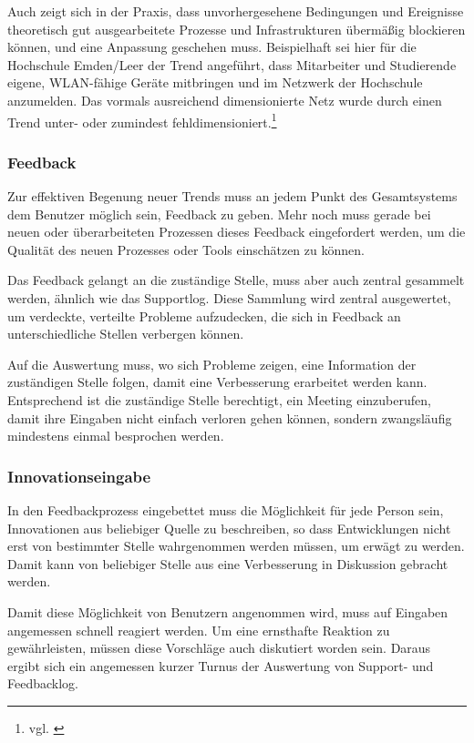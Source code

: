 Auch zeigt sich in der Praxis, dass unvorhergesehene Bedingungen und Ereignisse theoretisch gut ausgearbeitete Prozesse und Infrastrukturen übermäßig blockieren können, und eine Anpassung geschehen muss. Beispielhaft sei hier für die Hochschule Emden/Leer der Trend angeführt, dass Mitarbeiter und Studierende eigene, WLAN-fähige Geräte mitbringen und im Netzwerk der Hochschule anzumelden. Das vormals ausreichend dimensionierte Netz wurde durch einen Trend unter- oder zumindest fehldimensioniert.\footnote{vgl. \cite{gunter_muller_interview}}

\subsubsection{Feedback}
Zur effektiven Begenung neuer Trends muss an jedem Punkt des Gesamtsystems dem Benutzer möglich sein, Feedback zu geben. Mehr noch muss gerade bei neuen oder überarbeiteten Prozessen dieses Feedback eingefordert werden, um die Qualität des neuen Prozesses oder Tools einschätzen zu können.

Das Feedback gelangt an die zuständige Stelle, muss aber auch zentral gesammelt werden, ähnlich wie das Supportlog. Diese Sammlung wird zentral ausgewertet, um verdeckte, verteilte Probleme aufzudecken, die sich in Feedback an unterschiedliche Stellen verbergen können.

Auf die Auswertung muss, wo sich Probleme zeigen, eine Information der zuständigen Stelle folgen, damit eine Verbesserung erarbeitet werden kann. Entsprechend ist die zuständige Stelle berechtigt, ein Meeting einzuberufen, damit ihre Eingaben nicht einfach verloren gehen können, sondern zwangsläufig mindestens einmal besprochen werden.

\subsubsection{Innovationseingabe}
In den Feedbackprozess eingebettet muss die Möglichkeit für jede Person sein, Innovationen aus beliebiger Quelle zu beschreiben, so dass Entwicklungen nicht erst von bestimmter Stelle wahrgenommen werden müssen, um erwägt zu werden. Damit kann von beliebiger Stelle aus eine Verbesserung in Diskussion gebracht werden.

Damit diese Möglichkeit von Benutzern angenommen wird, muss auf Eingaben angemessen schnell reagiert werden. Um eine ernsthafte Reaktion zu gewährleisten, müssen diese Vorschläge auch diskutiert worden sein. Daraus ergibt sich ein angemessen kurzer Turnus der Auswertung von Support- und Feedbacklog.

